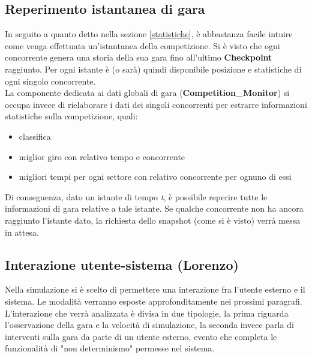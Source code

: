 \subsection{Reperimento istantanea di gara}
    In seguito a quanto detto nella sezione \ref{statistiche}, è abbastanza facile intuire come venga effettuata un'istantanea della competizione.
    Si è visto che ogni concorrente genera una storia della sua gara fino all'ultimo \textbf{Checkpoint} raggiunto. Per ogni istante è (o sarà)
    quindi disponibile posizione e statistiche di ogni singolo concorrente.\\
    La componente dedicata ai dati globali di gara (\textbf{Competition\_Monitor}) si occupa invece di rielaborare i dati dei singoli concorrenti
    per estrarre informazioni statistiche sulla competizione, quali:
    \begin{itemize}
    \item classifica
    \item miglior giro con relativo tempo e concorrente
    \item migliori tempi per ogni settore con relativo concorrente per ognuno di essi
    \end{itemize}
    Di conseguenza, dato un istante di tempo \emph{t}, è possibile reperire tutte le informazioni di gara relative a tale istante. Se qualche 
    concorrente non ha ancora raggiunto l'istante dato, la richiesta dello snapshot (come si è visto) verrà messa in attesa.
\subsection{Interazione utente-sistema (Lorenzo)}
Nella simulazione si è scelto di permettere una interazione fra l'utente esterno e il sistema. Le modalità verranno esposte approfonditamente nei prossimi paragrafi. L'interazione che verrà analizzata è divisa in due tipologie, la prima riguarda l'osservazione della gara e la velocità di simulazione, la seconda invece parla di interventi sulla gara da parte di un utente esterno, evento che completa le funzionalità di "non determinismo" permesse nel sistema.
